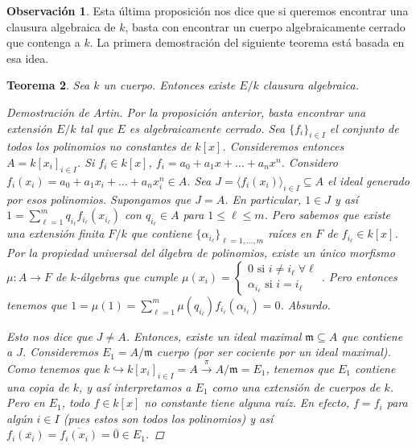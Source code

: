 \documentclass[12pt]{book}
\newtheorem{teo}{Teorema}[section]
\theoremstyle{definition}
\newtheorem{obs}[teo]{Observación}
\begin{document}
\begin{obs}
Esta última proposición nos dice que si queremos encontrar una clausura algebraica de $k$, basta con encontrar un cuerpo algebraicamente cerrado que contenga a $k$. La primera demostración del siguiente teorema está basada en esa idea.
\end{obs}

\begin{teo}
Sea $k$ un cuerpo. Entonces existe $E/k$ clausura algebraica.
\begin{proof}[Demostración de Artin]
Por la proposición anterior, basta encontrar una extensión $E/k$ tal que $E$ es algebraicamente cerrado. Sea $\{f_i\}_{i\in I}$ el conjunto de todos los polinomios no constantes de $k[x]$. Consideremos entonces $A=k[x_i]_{i\in I}$. Si $f_i\in k[x]$, $f_i = a_0 + a_1 x + \ldots + a_n x^n$. Considero $f_i(x_i) = a_0 + a_1 x_i + \ldots + a_n x_i^n \in A$. Sea $J=\langle f_i(x_i)\rangle_{i\in I}\subseteq A$ el ideal generado por esos polinomios. Supongamos que $J=A$. En particular, $1\in J$ y así $1=\displaystyle\sum_{\ell=1}^{m} q_{i_\ell} f_{i_\ell}(x_{i_\ell})$ con $q_{i_\ell}\in A$ para $1\leq \ell\leq m$. Pero sabemos que existe una extensión finita $F/k$ que contiene $\{\alpha_{i_\ell}\}_{\ell=1,\ldots, m}$ raíces en $F$ de $f_{i_\ell}\in k[x]$. Por la propiedad universal del álgebra de polinomios, existe un único morfismo $\mu:A\to F$ de $k$-álgebras que cumple $\mu(x_i)=\begin{cases}0 \text{ si }i\neq i_\ell \;\forall \ell \\ \alpha_{i_\ell} \text{ si }i=i_\ell \end{cases}$. Pero entonces tenemos que $1= \mu(1) = \displaystyle\sum_{\ell=1}^m \mu(q_{i_\ell}) f_{i_\ell}(\alpha_{i_\ell}) = 0$. Absurdo.

Esto nos dice que $J\neq A$. Entonces, existe un ideal maximal $\mathfrak{m}\subseteq A$ que contiene a $J$. Consideremos $E_1 = A/\mathfrak{m}$ cuerpo (por ser cociente por un ideal maximal). Como tenemos que $k\hookrightarrow k[x_i]_{i\in I}=A \stackrel{\pi}{\longrightarrow} A/\mathfrak{m}=E_1$, tenemos que $E_1$ contiene una copia de $k$, y así interpretamos a $E_1$ como una extensión de cuerpos de $k$. Pero en $E_1$, todo $f\in k[x]$ no constante tiene alguna raíz. En efecto, $f = f_i$ para algún $i\in I$ (pues estos son todos los polinomios) y así $f_i(\overline{x_i}) = \overline{f_i(x_i)} = \overline{0}\in E_1$.


\end{proof}
\end{teo}
\end{document}
